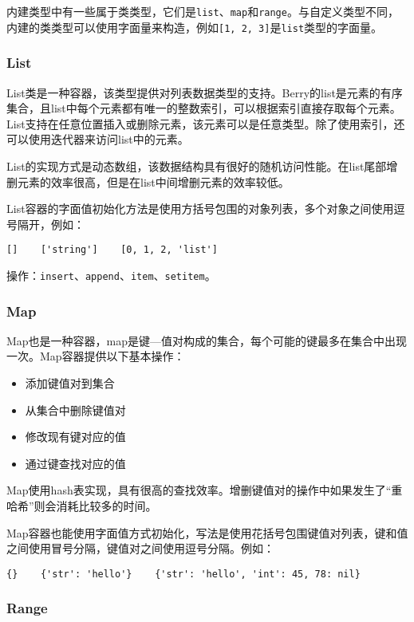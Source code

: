 内建类型中有一些属于类类型，它们是\texttt{list}、\texttt{map}和\texttt{range}。与自定义类型不同，内建的类类型可以使用字面量来构造，例如\texttt{[1, 2, 3]}是\texttt{list}类型的字面量。

\subsubsection{List}

List类是一种容器，该类型提供对列表数据类型的支持。Berry的list是元素的有序集合，且list中每个元素都有唯一的整数索引，可以根据索引直接存取每个元素。List支持在任意位置插入或删除元素，该元素可以是任意类型。除了使用索引，还可以使用迭代器来访问list中的元素。

List的实现方式是动态数组，该数据结构具有很好的随机访问性能。在list尾部增删元素的效率很高，但是在list中间增删元素的效率较低。

List容器的字面值初始化方法是使用方括号包围的对象列表，多个对象之间使用逗号隔开，例如：
\begin{lstlisting}[language=berry, numbers=none]
[]    ['string']    [0, 1, 2, 'list']
\end{lstlisting}

操作：\texttt{insert}、\texttt{append}、\texttt{item}、\texttt{setitem}。

\subsubsection{Map}

Map也是一种容器，map是键—值对构成的集合，每个可能的键最多在集合中出现一次。Map容器提供以下基本操作：
\begin{itemize}
    \item 添加键值对到集合
    \item 从集合中删除键值对
    \item 修改现有键对应的值
    \item 通过键查找对应的值
\end{itemize}

Map使用hash表实现，具有很高的查找效率。增删键值对的操作中如果发生了``重哈希''则会消耗比较多的时间。

Map容器也能使用字面值方式初始化，写法是使用花括号包围键值对列表，键和值之间使用冒号分隔，键值对之间使用逗号分隔。例如：
\begin{lstlisting}[language=berry, numbers=none]
{}    {'str': 'hello'}    {'str': 'hello', 'int': 45, 78: nil}
\end{lstlisting}

\subsubsection{Range}

